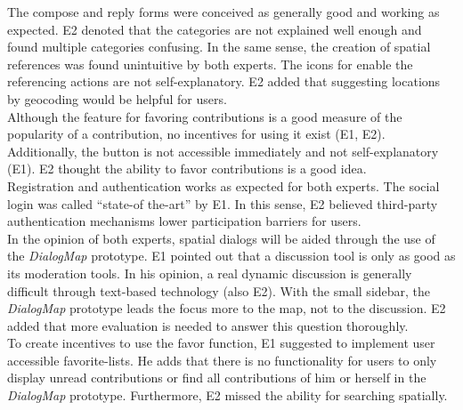 The compose and reply forms were conceived as generally good and working as expected. E2 denoted that the categories are not explained well enough and found multiple categories confusing. In the same sense, the creation of spatial references was found unintuitive by both experts. The icons for enable the referencing actions are not self-explanatory. E2 added that suggesting locations by geocoding would be helpful for users.\\
Although the feature for favoring contributions is a good measure of the popularity of a contribution, no incentives for using it exist (E1, E2). Additionally, the button is not accessible immediately and not self-explanatory (E1). E2 thought the ability to favor contributions is a good idea.\\
Registration and authentication works as expected for both experts. The social login was called ``state-of the-art'' by E1. In this sense, E2 believed third-party authentication mechanisms lower participation barriers for users.\\
In the opinion of both experts, spatial dialogs will be aided through the use of the \textit{DialogMap} prototype. E1 pointed out that a discussion tool is only as good as its moderation tools. In his opinion, a real dynamic discussion is generally difficult through text-based technology (also E2). With the small sidebar, the \textit{DialogMap} prototype leads the focus more to the map, not to the discussion. E2 added that more evaluation is needed to answer this question thoroughly.\\
To create incentives to use the favor function, E1 suggested to implement user accessible favorite-lists. He adds that there is no functionality for users to only display unread contributions or find all contributions of him or herself in the \textit{DialogMap} prototype. Furthermore, E2 missed the ability for searching spatially.\\

